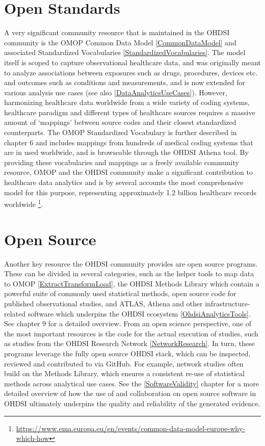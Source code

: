 \documentclass[11pt]{book}
\let\rmarkdownfootnote\footnote%
\def\footnote{\protect\rmarkdownfootnote}
\theoremstyle{definition}
\theoremstyle{definition}
\theoremstyle{definition}
\theoremstyle{remark}
\begin{document}
\hypertarget{open-standards}{%
\section{Open Standards}\label{open-standards}}


A very significant community resource that is maintained in the OHDSI community is the OMOP Common Data Model \ref{CommonDataModel} and associated Standardized Vocabularies \ref{StandardizedVocabularies}. The model itself is scoped to capture observational healthcare data, and was originally meant to analyze associations between exposures such as drugs, procedures, devices etc. and outcomes such as conditions and measurements, and is now extended for various analysis use cases (see also \ref{DataAnalyticsUseCases}). However, harmonizing healthcare data worldwide from a wide variety of coding systems, healthcare paradigm and different types of healthcare sources requires a massive amount of `mappings' between source codes and their closest standardized counterparts. The OMOP Standardized Vocabulary is further described in chapter 6 and includes mappings from hundreds of medical coding systems that are in used worldwide, and is browseable through the OHDSI Athena tool. By providing these vocabularies and mappings as a freely available community resource, OMOP and the OHDSI community make a significant contribution to healthcare data analytics and is by several accounts the most comprehensive model for this purpose, representing approximately 1.2 billion healthcare records worldwide \citep{garza_2016} \footnote{\url{https://www.ema.europa.eu/en/events/common-data-model-europe-why-which-how}}.

\hypertarget{open-source}{%
\section{Open Source}\label{open-source}}


Another key resource the OHDSI community provides are open source programs. These can be divided in several categories, such as the helper tools to map data to OMOP \ref{ExtractTransformLoad}, the OHDSI Methods Library which contain a powerful suite of commonly used statistical methods, open source code for published observational studies, and ATLAS, Athena and other infrastructure-related software which underpins the OHDSI ecosystem \ref{OhdsiAnalyticsTools}. See chapter 9 for a detailed overview.
From an open science perspective, one of the most important resources is the code for the actual execution of studies, such as studies from the OHDSI Research Network \ref{NetworkResearch}. In turn, these programs leverage the fully open source OHDSI stack, which can be inspected, reviewed and contributed to via GitHub. For example, network studies often build on the Methods Library, which ensures a consistent re-use of statistical methods across analytical use cases. See the \ref{SoftwareValidity} chapter for a more detailed overview of how the use of and collaboration on open source software in OHDSI ultimately underpins the quality and reliability of the generated evidence.
\end{document}
